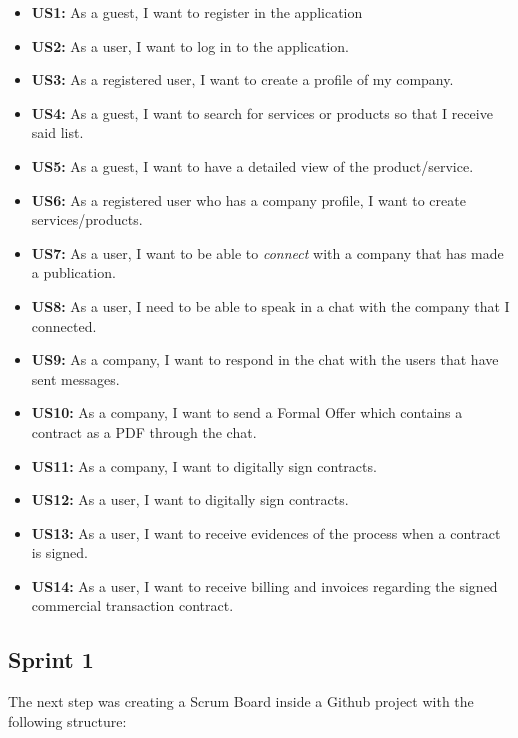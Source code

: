 \documentclass[./main.tex]{subfiles}
\begin{document}
\begin{itemize}

\item
  \textbf{US1:} As a guest, I want to register in the application
\item
  \textbf{US2:} As a user, I want to log in to the application.
\item
  \textbf{US3:} As a registered user, I want to create a profile of my
  company.
\item
  \textbf{US4:} As a guest, I want to search for services or products so
  that I receive said list.
\item
  \textbf{US5:} As a guest, I want to have a detailed view of the
  product/service.
\item
  \textbf{US6:} As a registered user who has a company profile, I want
  to create services/products.
\item
  \textbf{US7:} As a user, I want to be able to \emph{connect} with a
  company that has made a publication.
\item
  \textbf{US8:} As a user, I need to be able to speak in a chat with the
  company that I connected.
\item
  \textbf{US9:} As a company, I want to respond in the chat with the
  users that have sent messages.
\item
  \textbf{US10:} As a company, I want to send a Formal Offer which
  contains a contract as a PDF through the chat.
\item
  \textbf{US11:} As a company, I want to digitally sign contracts.
\item
  \textbf{US12:} As a user, I want to digitally sign contracts.
\item
  \textbf{US13:} As a user, I want to receive evidences of the process
  when a contract is signed.
\item
  \textbf{US14:} As a user, I want to receive billing and invoices
  regarding the signed commercial transaction contract.
\end{itemize}

\hypertarget{sprint-1}{%
\subsection{Sprint 1}\label{sprint-1}}

The next step was creating a Scrum Board inside a Github project with
the following structure:
\end{document}
